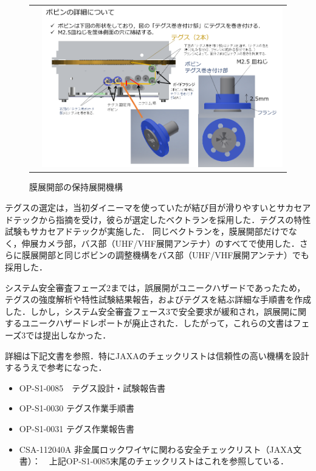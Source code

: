 \begin{figure}[H]
\begin{tabular}{cc}
\begin{minipage}{0.5\hsize}
\begin{center}
				\end{center}
			\end{minipage}&
			\begin{minipage}{0.5\hsize}
				\begin{center}
			  	   \includegraphics[width=.7\textwidth]{03/fig/3-9-3-1-23.png}
				\end{center}
			\end{minipage}
		\end{tabular}
		\caption{膜展開部の保持展開機構}
	\label{fig3-9-3-1-18}
\end{figure}

テグスの選定は，当初ダイニーマを使っていたが結び目が滑りやすいとサカセアドテックから指摘を受け，彼らが選定したベクトランを採用した．テグスの特性試験もサカセアドテックが実施した．
同じベクトランを，膜展開部だけでなく，伸展カメラ部，バス部（UHF/VHF展開アンテナ）のすべてで使用した．さらに膜展開部と同じボビンの調整機構をバス部（UHF/VHF展開アンテナ）でも採用した．

システム安全審査フェーズ2までは，誤展開がユニークハザードであったため，テグスの強度解析や特性試験結果報告，およびテグスを結ぶ詳細な手順書を作成した．しかし，システム安全審査フェース3で安全要求が緩和され，誤展開に関するユニークハザードレポートが廃止された．したがって，これらの文書はフェーズ3では提出しなかった．

詳細は下記文書を参照．特にJAXAのチェックリストは信頼性の高い機構を設計するうえで参考になった．
\begin{itemize}
	\item OP-S1-0085　テグス設計・試験報告書
	\item OP-S1-0030 テグス作業手順書
	\item OP-S1-0031 テグス作業報告書
	\item CSA-112040A 非金属ロックワイヤに関わる安全チェックリスト（JAXA文書）：　上記OP-S1-0085末尾のチェックリストはこれを参照している．
\end{itemize}
